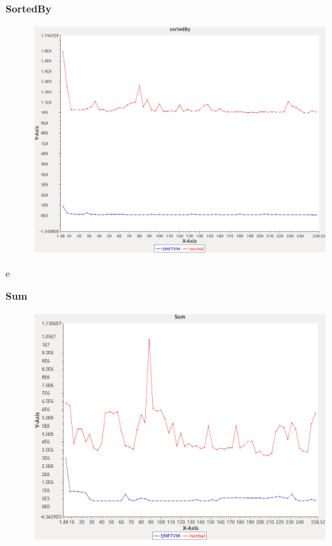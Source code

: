 \noindent\textbf{SortedBy}

\begin{figure}[h]
\centering
\includegraphics[width=\textwidth]{graphs/bag/sortedBy}
\end{figure}e
\pagebreak

\noindent\textbf{Sum}

\begin{figure}[h]
\centering
\includegraphics[width=\textwidth]{graphs/bag/Sum}
\end{figure}
\pagebreak
